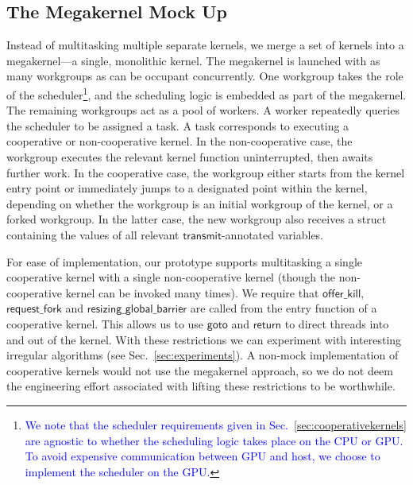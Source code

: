 \documentclass[sigconf]{acmart}
\newcommand{\TSAdded}[1]{\textcolor{blue}{#1}}
\newcommand{\mysec}{Sec.~}
\newcommand{\transmit}{\mathsf{transmit}}
\newcommand{\offerfork}{\mathsf{request\_fork}}
\newcommand{\offerkill}{\mathsf{offer\_kill}}
\newcommand{\resizingglobalbarrier}{\mathsf{resizing\_global\_barrier}}
\newcommand{\keyword}[1]{\mathsf{#1}}
\begin{document}
{\subsection{The Megakernel Mock Up}\label{sec:megakernel}

Instead of multitasking multiple separate kernels, we merge a set of
kernels into a megakernel---a single, monolithic kernel.  The
megakernel is launched with as many workgroups as can be occupant
concurrently.  One workgroup takes the role of the
scheduler\footnote{\TSAdded{We note that the scheduler requirements
    given in \mysec{\ref{sec:cooperativekernels}} are agnostic to
    whether the scheduling logic takes place on the CPU or GPU. To
    avoid expensive communication between GPU and host, we choose to
    implement the scheduler on the GPU.}  }, and the scheduling logic
is embedded as part of the megakernel.  The remaining workgroups act
as a pool of workers.  A worker repeatedly queries the scheduler to be
assigned a task.  A task corresponds to executing a cooperative or
non-cooperative kernel.  In the non-cooperative case, the workgroup
executes the relevant kernel function uninterrupted, then awaits
further work.  In the cooperative case, the workgroup either starts
from the kernel entry point or immediately jumps to a designated point
within the kernel, depending on whether the workgroup is an initial
workgroup of the kernel, or a forked workgroup.  In the latter case,
the new workgroup also receives a struct containing the values of all
relevant $\transmit$-annotated variables.

%
For ease of implementation, our prototype supports multitasking a
single cooperative kernel with a single non-cooperative kernel (though
the non-cooperative kernel can be invoked many times).
We require that $\offerkill$, $\offerfork$ and
$\resizingglobalbarrier$ are called from the entry function of a
cooperative kernel.  This allows us to use $\keyword{goto}$ and
$\keyword{return}$ to direct threads into and out of the kernel.  With
these restrictions we can experiment with interesting irregular
algorithms (see \mysec\ref{sec:experiments}).  A non-mock
implementation of cooperative kernels would not use the megakernel
approach, so we do not deem the engineering effort associated with
lifting these restrictions to be worthwhile.

}
\end{document}
